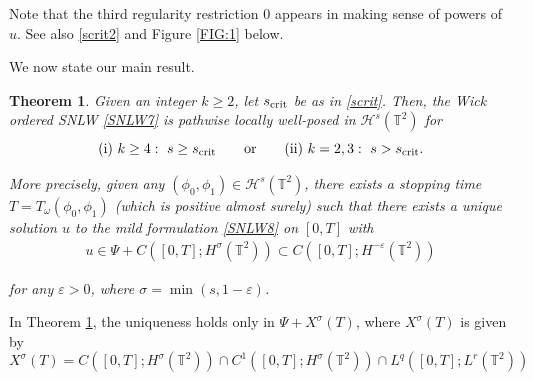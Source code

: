 \documentclass[letterpaper, 11pt,  reqno]{amsart}
\newtheorem{theorem}{Theorem} [section]
\newcommand{\1}{\hspace{0.5mm}\text{I}\hspace{0.5mm}}
\newcommand{\noi}{\noindent}
\newcommand{\T}{\mathbb{T}}
\newcommand{\eps}{\varepsilon}
\newcommand{\s}{\sigma}
\renewcommand{\o}{\omega}
\renewcommand{\H}{\mathcal{H}}
\numberwithin{equation}{section}
\numberwithin{theorem}{section}
\newcommand{\notemax}[1]{\marginpar{\color{red} $\Leftarrow\Leftarrow\Leftarrow$}{\color{red}MAX: #1}}
\newcommand{\noteherbert}[1]{\marginpar{\color{red} $\Leftarrow\Leftarrow\Leftarrow$}{\color{purple}Herbert: #1}}
\newcommand{\hiro}[1]{\marginpar{\color{red} $\Leftarrow\Leftarrow\Leftarrow$}{\smallskip \noi\color{blue}HIRO: #1}\smallskip}
\begin{document}
\noi
Note that the third regularity restriction
$0$
appears in making sense of powers of $u$.
See also \eqref{scrit2} and Figure \ref{FIG:1} below.
%
%
%
%
%
%
%
%
%

We now state our main result.

\begin{theorem}\label{THM:1}
Given  an integer  $k \geq 2$, let $s_\textup{crit}$ be as in \eqref{scrit}.
Then, the Wick ordered SNLW \eqref{SNLW7}
is pathwise locally well-posed in $\H^s(\T^2)$
for 
\[ \textup{(i) } k \geq 4: 
\ s \geq  s_\textup{crit}
\qquad \text{or} \qquad 
 \textup{(ii) }  k = 2, 3: 
\ s >  s_\textup{crit}.
\]



\noi
More precisely, 
given any $(\phi_0, \phi_1) \in \H^s(\T^2)$, 
there exists a stopping time $T =  T_\o( \phi_0, \phi_1)$
(which is positive almost surely)
such that there exists  a unique solution $u $ to the mild formulation \eqref{SNLW8} on $[0, T]$
with 
\begin{align*}
u \in    \Psi + C([0, T]; H^\s(\T^2)) 
\subset C([0, T]; H^{-\eps}(\T^2)) 
\end{align*}
	
\noi
for any $\eps > 0$, where $\s = \min(s, 1-\eps)$.

\end{theorem} 

In Theorem \ref{THM:1}, 
the uniqueness holds only in 
 $\Psi + X^\s(T)$, 
  where $X^\s(T)$ is given by %
\[ X^\s(T) = C([0,T];H^\s(\T^2))\cap C^1([0,T]; H^\s(\T^2))\cap L^q([0, T]; L^r(\T^2))
\]
\end{document}
